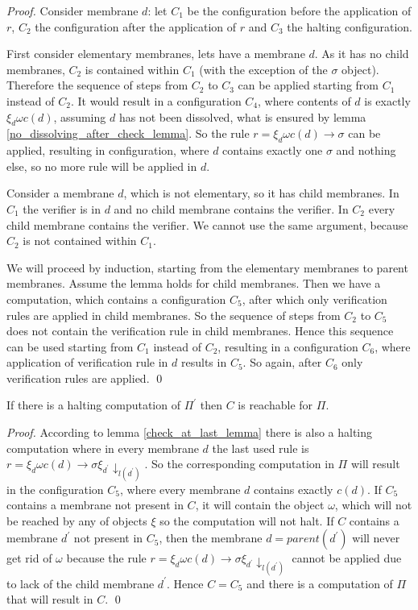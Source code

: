 \documentclass[llncs,submission,copyright,creativecommons]{../lib/lncs/llncs}
\begin{document}
\begin{proof}
  Consider membrane $d$: let $C_1$ be the configuration before the application of $r$, $C_2$ the configuration after the application of $r$ and $C_3$ the halting configuration.

  First consider elementary membranes, lets have a membrane $d$. As it has no child membranes, $C_2$ is contained within $C_1$ (with the exception of the $\sigma$ object). Therefore the sequence of steps from $C_2$ to $C_3$ can be applied starting from $C_1$ instead of $C_2$.
  It would result in a configuration $C_4$, where contents of $d$ is exactly $\xi_d\omega c(d)$, assuming $d$ has not been dissolved, what is ensured by lemma \ref{no_dissolving_after_check_lemma}. So the rule $r = \xi_d\omega c(d)\rightarrow\sigma$ can be applied, resulting in configuration, where $d$ contains exactly one $\sigma$ and nothing else, so no more rule will be applied in $d$.

  Consider a membrane $d$, which is not elementary, so it has child membranes. In $C_1$ the verifier is in $d$ and no child membrane contains the verifier. In $C_2$ every child membrane contains the verifier. We cannot use the same argument, because $C_2$ is not contained within $C_1$.

  We will proceed by induction, starting from the elementary membranes to parent membranes. Assume the lemma holds for child membranes. Then we have a computation, which contains a configuration $C_5$, after which only verification rules are applied in child membranes. So the sequence of steps from $C_2$ to $C_5$ does not contain the verification rule in child membranes. Hence this sequence can be used starting from $C_1$ instead of $C_2$, resulting in a configuration $C_6$, where application of verification rule in $d$ results in $C_5$. So again, after $C_6$ only verification rules are applied.
  \qed
\end{proof}

\begin{lemma}
\label{if_halting_then_reachable_lemma}
  If there is a halting computation of $\Pi^\prime$ then $C$ is reachable for $\Pi$.
\end{lemma}

\begin{proof}
  According to lemma \ref{check_at_last_lemma} there is also a halting computation where in every membrane $d$ the last used rule is $r = \xi_d\omega c(d)\rightarrow\sigma\xi_{d^\prime}\downarrow_{l(d^\prime)}$. So the corresponding computation in $\Pi$ will result in the configuration $C_5$, where every membrane $d$ contains exactly $c(d)$. If $C_5$ contains a membrane not present in $C$, it will contain the object $\omega$, which will not be reached by any of objects $\xi$ so the computation will not halt. If $C$ contains a membrane $d^\prime$ not present in $C_5$, then the membrane $d = parent(d^\prime)$ will never get rid of $\omega$ because the rule $r = \xi_d\omega c(d)\rightarrow\sigma\xi_{d^\prime}\downarrow_{l(d^\prime)}$ cannot be applied due to lack of the child membrane $d^\prime$. Hence $C = C_5$ and there is a computation of $\Pi$ that will result in $C$. \qed
\end{proof}
\end{document}
